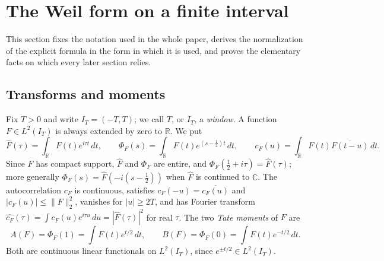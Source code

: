 \documentclass[11pt]{amsart}
\theoremstyle{definition}
\theoremstyle{remark}
\numberwithin{equation}{section}
\newcommand{\C}{\mathbb{C}}
\newcommand{\R}{\mathbb{R}}
\newcommand{\IT}{I_T}                                  %
\newcommand{\Fh}{\widehat F}                           %
\newcommand{\cF}{c_F}                                  %
\newcommand{\PhiF}{\Phi_F}                             %
\begin{document}
\section{The Weil form on a finite interval}\label{w1:sec:setting}

This section fixes the notation used in the whole paper, derives the
normalization of the explicit formula in the form in which it is used, and
proves the elementary facts on which every later section relies.

\subsection{Transforms and moments}
Fix $T>0$ and write $\IT=(-T,T)$; we call $T$, or $\IT$, a \emph{window}.
A function $F\in L^2(\IT)$ is always extended by zero to $\R$. We put
\begin{equation}\label{w1:eq:transforms}
  \Fh(\tau)=\int_\R F(t)e^{i\tau t}\,dt,\qquad
  \PhiF(s)=\int_\R F(t)e^{(s-\frac12)t}\,dt,\qquad
  \cF(u)=\int_\R F(t)\overline{F(t-u)}\,dt .
\end{equation}
Since $F$ has compact support, $\Fh$ and $\PhiF$ are entire, and
$\PhiF(\tfrac12+i\tau)=\Fh(\tau)$; more generally $\PhiF(s)=\Fh(-i(s-\frac12))$
when $\Fh$ is continued to $\C$. The autocorrelation $\cF$ is continuous,
satisfies $\cF(-u)=\overline{\cF(u)}$ and $|\cF(u)|\le\|F\|_2^2$, vanishes for
$|u|\ge2T$, and has Fourier transform
$\widehat{\cF}(\tau)=\int\cF(u)e^{i\tau u}\,du=|\Fh(\tau)|^2$ for real $\tau$.
The two \emph{Tate moments} of $F$ are
\begin{equation}\label{w1:eq:tate}
  A(F)=\PhiF(1)=\int F(t)e^{t/2}\,dt,\qquad
  B(F)=\PhiF(0)=\int F(t)e^{-t/2}\,dt .
\end{equation}
Both are continuous linear functionals on $L^2(\IT)$, since
$e^{\pm t/2}\in L^2(\IT)$.
\end{document}
